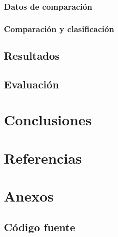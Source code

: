 \documentclass[letter]{article}
\begin{document}
\subsubsection{Datos de comparación}
\label{sec:org799836a}

\subsubsection{Comparación y clasificación}
\label{sec:org054ffd2}

\subsection{Resultados}
\label{sec:orgcc6effd}
\subsection{Evaluación}
\label{sec:org39eb637}
\section{Conclusiones}
\label{sec:orge54ccfa}

\section{Referencias}
\label{sec:orgacc554d}

\section{Anexos}
\label{sec:org1d370c0}
\subsection{Código fuente}
\label{sec:orgbff1131}
\end{document}
